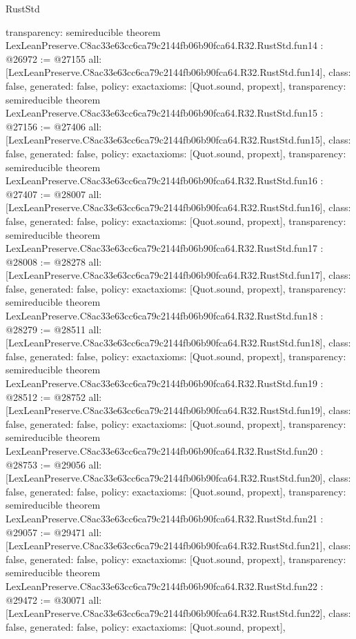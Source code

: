 \begin{lexlean}{RustStd}
\begin{coremodule}
{  transparency: semireducible
}
theorem LexLeanPreserve.C8ac33e63cc6ca79c2144fb06b90fca64.R32.RustStd.fun14 : @26972 := @27155 {
  all: [LexLeanPreserve.C8ac33e63cc6ca79c2144fb06b90fca64.R32.RustStd.fun14],
  class: false,
  generated: false,
  policy: exact{axioms: [Quot.sound, propext]},
  transparency: semireducible
}
theorem LexLeanPreserve.C8ac33e63cc6ca79c2144fb06b90fca64.R32.RustStd.fun15 : @27156 := @27406 {
  all: [LexLeanPreserve.C8ac33e63cc6ca79c2144fb06b90fca64.R32.RustStd.fun15],
  class: false,
  generated: false,
  policy: exact{axioms: [Quot.sound, propext]},
  transparency: semireducible
}
theorem LexLeanPreserve.C8ac33e63cc6ca79c2144fb06b90fca64.R32.RustStd.fun16 : @27407 := @28007 {
  all: [LexLeanPreserve.C8ac33e63cc6ca79c2144fb06b90fca64.R32.RustStd.fun16],
  class: false,
  generated: false,
  policy: exact{axioms: [Quot.sound, propext]},
  transparency: semireducible
}
theorem LexLeanPreserve.C8ac33e63cc6ca79c2144fb06b90fca64.R32.RustStd.fun17 : @28008 := @28278 {
  all: [LexLeanPreserve.C8ac33e63cc6ca79c2144fb06b90fca64.R32.RustStd.fun17],
  class: false,
  generated: false,
  policy: exact{axioms: [Quot.sound, propext]},
  transparency: semireducible
}
theorem LexLeanPreserve.C8ac33e63cc6ca79c2144fb06b90fca64.R32.RustStd.fun18 : @28279 := @28511 {
  all: [LexLeanPreserve.C8ac33e63cc6ca79c2144fb06b90fca64.R32.RustStd.fun18],
  class: false,
  generated: false,
  policy: exact{axioms: [Quot.sound, propext]},
  transparency: semireducible
}
theorem LexLeanPreserve.C8ac33e63cc6ca79c2144fb06b90fca64.R32.RustStd.fun19 : @28512 := @28752 {
  all: [LexLeanPreserve.C8ac33e63cc6ca79c2144fb06b90fca64.R32.RustStd.fun19],
  class: false,
  generated: false,
  policy: exact{axioms: [Quot.sound, propext]},
  transparency: semireducible
}
theorem LexLeanPreserve.C8ac33e63cc6ca79c2144fb06b90fca64.R32.RustStd.fun20 : @28753 := @29056 {
  all: [LexLeanPreserve.C8ac33e63cc6ca79c2144fb06b90fca64.R32.RustStd.fun20],
  class: false,
  generated: false,
  policy: exact{axioms: [Quot.sound, propext]},
  transparency: semireducible
}
theorem LexLeanPreserve.C8ac33e63cc6ca79c2144fb06b90fca64.R32.RustStd.fun21 : @29057 := @29471 {
  all: [LexLeanPreserve.C8ac33e63cc6ca79c2144fb06b90fca64.R32.RustStd.fun21],
  class: false,
  generated: false,
  policy: exact{axioms: [Quot.sound, propext]},
  transparency: semireducible
}
theorem LexLeanPreserve.C8ac33e63cc6ca79c2144fb06b90fca64.R32.RustStd.fun22 : @29472 := @30071 {
  all: [LexLeanPreserve.C8ac33e63cc6ca79c2144fb06b90fca64.R32.RustStd.fun22],
  class: false,
  generated: false,
  policy: exact{axioms: [Quot.sound, propext]},
}
\end{coremodule}
\end{lexlean}

